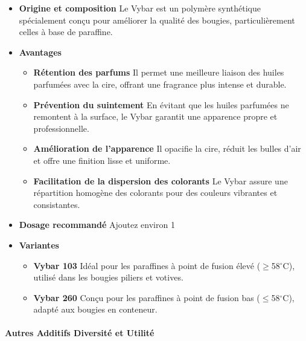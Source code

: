 \documentclass[11pt,fleqn,onecolumn,oneside]{book}
\begin{document}
\begin{itemize}
    \item \textbf{Origine et composition} Le Vybar est un polymère synthétique spécialement conçu pour améliorer la qualité des bougies, particulièrement celles à base de paraffine.
    \item \textbf{Avantages}
        \begin{itemize}
            \item \textbf{Rétention des parfums} Il permet une meilleure liaison des huiles parfumées avec la cire, offrant une fragrance plus intense et durable.
            \item \textbf{Prévention du suintement} En évitant que les huiles parfumées ne remontent à la surface, le Vybar garantit une apparence propre et professionnelle.
            \item \textbf{Amélioration de l’apparence} Il opacifie la cire, réduit les bulles d’air et offre une finition lisse et uniforme.
            \item \textbf{Facilitation de la dispersion des colorants} Le Vybar assure une répartition homogène des colorants pour des couleurs vibrantes et consistantes.
        \end{itemize}
    \item \textbf{Dosage recommandé} Ajoutez environ 1 %
    \item \textbf{Variantes}
\begin{itemize}
    \item \textbf{Vybar 103} Id\'eal pour les paraffines \`a point de fusion \'elev\'e ($\geq$58$^\circ$C), utilis\'e dans les bougies piliers et votives.
    \item \textbf{Vybar 260} Con\c{c}u pour les paraffines \`a point de fusion bas ($\leq$58$^\circ$C), adapt\'e aux bougies en conteneur.
\end{itemize}

\end{itemize}

\paragraph{Autres Additifs Diversité et Utilité}
\end{document}
